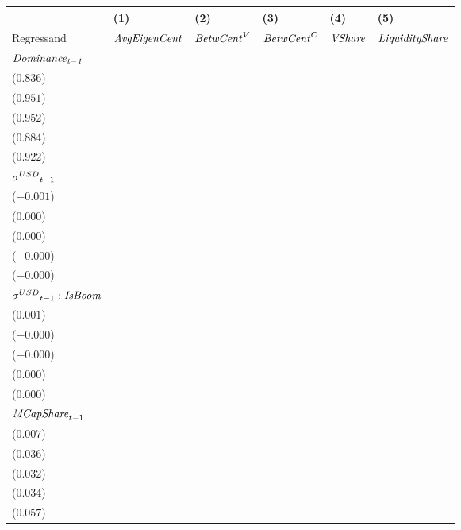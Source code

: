 \begin{tabular}{llllll}
\toprule
{} &                                      (1) &                                      (2) &                                      (3) &                                      (4) &                                      (5) \\
\midrule
Regressand                                  &                     ${\it AvgEigenCent}$ &                       ${\it BetwCent}^V$ &                       ${\it BetwCent}^C$ &                           ${\it VShare}$ &                   ${\it LiquidityShare}$ \\
$\it Dominance_{t-1}$                       &    \makecell{$0.835^{***}$ \\ ($0.836$)} &    \makecell{$0.951^{***}$ \\ ($0.951$)} &    \makecell{$0.952^{***}$ \\ ($0.952$)} &    \makecell{$0.883^{***}$ \\ ($0.884$)} &    \makecell{$0.922^{***}$ \\ ($0.922$)} \\
${{\it \sigma}^{USD}}_{t-1}$                &     \makecell{$-0.000^{}$ \\ ($-0.001$)} &       \makecell{$0.000^{}$ \\ ($0.000$)} &       \makecell{$0.000^{}$ \\ ($0.000$)} &     \makecell{$-0.000^{}$ \\ ($-0.000$)} &     \makecell{$-0.000^{}$ \\ ($-0.000$)} \\
${{\it \sigma}^{USD}}_{t-1} : {\it IsBoom}$ &     \makecell{$0.000^{**}$ \\ ($0.001$)} &     \makecell{$-0.000^{}$ \\ ($-0.000$)} &     \makecell{$-0.000^{}$ \\ ($-0.000$)} &       \makecell{$0.000^{}$ \\ ($0.000$)} &       \makecell{$0.000^{}$ \\ ($0.000$)} \\
${{\it MCapShare}}_{t-1}$                   &    \makecell{$0.012^{***}$ \\ ($0.007$)} &    \makecell{$0.033^{***}$ \\ ($0.036$)} &    \makecell{$0.036^{***}$ \\ ($0.032$)} &    \makecell{$0.031^{***}$ \\ ($0.034$)} &    \makecell{$0.043^{***}$ \\ ($0.057$)} \\

\end{tabular}
